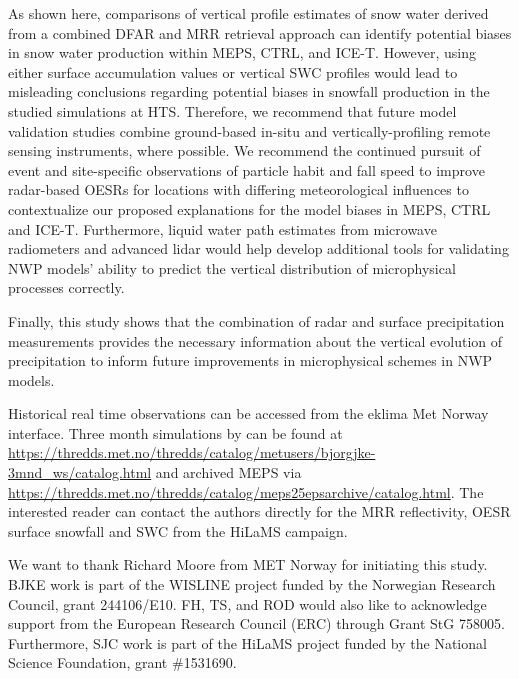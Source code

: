 \documentclass{ametsocV5}
\begin{document}
	As shown here, comparisons of vertical profile estimates of snow water derived from a combined DFAR and MRR retrieval approach can identify potential biases in snow water production within MEPS, CTRL, and ICE-T. However, using either surface accumulation values or vertical SWC profiles would lead to misleading conclusions regarding potential biases in snowfall production in the studied simulations at HTS. Therefore, we recommend that future model validation studies combine ground-based in-situ and vertically-profiling remote sensing instruments, where possible. We recommend the continued pursuit of event and site-specific observations of particle habit and fall speed to improve radar-based OESRs for locations with differing meteorological influences to contextualize our proposed explanations for the model biases in MEPS, CTRL and ICE-T. Furthermore, liquid water path estimates from microwave radiometers and advanced lidar would help develop additional tools for validating NWP models' ability to predict the vertical distribution of microphysical processes correctly. 
	
	Finally, this study shows that the combination of radar and surface precipitation measurements provides the necessary information about the vertical evolution of precipitation to inform future improvements in microphysical schemes in NWP models. 



%
\datastatement
Historical real time observations can be accessed from the eklima Met Norway interface.
Three month simulations by \citet{engdahl_effects_2020} can be found at \url{https://thredds.met.no/thredds/catalog/metusers/bjorgjke-3mnd_ws/catalog.html} and archived MEPS via \url{https://thredds.met.no/thredds/catalog/meps25epsarchive/catalog.html}. The interested reader can contact the authors directly for the MRR reflectivity, OESR surface snowfall and SWC from the HiLaMS campaign. 

%
\acknowledgments
We want to thank Richard Moore from MET Norway for initiating this study. BJKE work is part of the WISLINE project funded by the Norwegian Research Council, grant 244106/E10. FH, TS, and ROD would also like to acknowledge support from the European Research Council (ERC) through Grant StG 758005. Furthermore, SJC work is part of the HiLaMS project funded by the National Science Foundation, grant \#1531690. 
\end{document}
